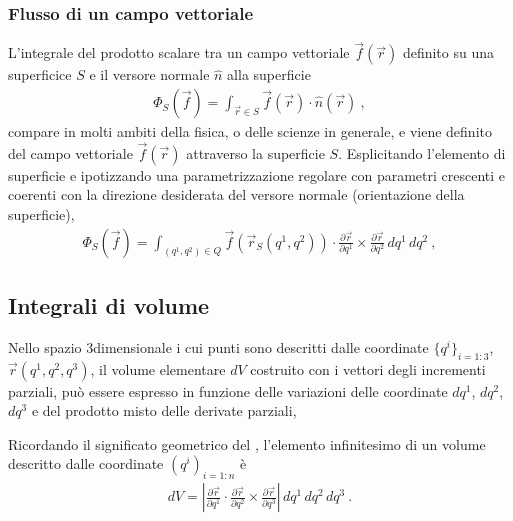 \documentclass[letterpaper,10pt,italian]{jupyterBook}
\begin{document}
\subsubsection{Flusso di un campo vettoriale}
\label{\detokenize{ch/vector-calculus/integrals:flusso-di-un-campo-vettoriale}}\label{\detokenize{ch/vector-calculus/integrals:vector-calculus-integrals-surface-flux}}
\sphinxAtStartPar
L’integrale del prodotto scalare tra un campo vettoriale \(\vec{f}(\vec{r})\) definito su una superficice \(S\) e il versore normale \(\hat{n}\) alla superficie
\begin{equation}\label{equation:ch/vector-calculus/integrals:eq:integral:flux}
\begin{split}\Phi_{S}(\vec{f}) = \int_{\vec{r} \in S} \vec{f}(\vec{r}) \cdot \hat{n}(\vec{r}) \ ,\end{split}
\end{equation}
\sphinxAtStartPar
compare in molti ambiti della fisica, o delle scienze in generale, e viene definito  del campo vettoriale \(\vec{f}(\vec{r})\) attraverso la superficie \(S\). Esplicitando l’elemento di superficie e ipotizzando una parametrizzazione regolare con parametri crescenti e coerenti con la direzione desiderata del versore normale (orientazione della superficie),
\begin{equation}\label{equation:ch/vector-calculus/integrals:eq:integral:flux:coords}
\begin{split}\Phi_{S}(\vec{f}) = \int_{(q^1, q^2) \in Q} \vec{f}(\vec{r}_S(q^1, q^2)) \cdot \frac{\partial \vec{r}}{\partial q^1} \times \frac{\partial \vec{r}}{\partial q^2} \, d q^1 \, d q^2 \ ,\end{split}
\end{equation}

\subsection{Integrali di volume}
\label{\detokenize{ch/vector-calculus/integrals:integrali-di-volume}}\label{\detokenize{ch/vector-calculus/integrals:vector-calculus-integrals-volume}}
\sphinxAtStartPar
Nello spazio 3\sphinxhyphen{}dimensionale i cui punti sono descritti dalle coordinate \(\{ q^i \}_{i=1:3}\), \(\vec{r}(q^1, q^2, q^3)\), il volume elementare \(dV\) costruito con i vettori degli incrementi parziali, può essere espresso in funzione delle variazioni delle coordinate \(d q^1\), \(d q^2\), \(d q^3\) e del prodotto misto delle derivate parziali,

\sphinxAtStartPar
Ricordando il significato geometrico del , l’elemento infinitesimo di un volume descritto dalle coordinate \(\left( q^i \right)_{i=1:n}\) è
\begin{equation*}
\begin{split}dV = \left| \frac{\partial \vec{r}}{\partial q^1} \cdot \frac{\partial \vec{r}}{\partial q^2} \times \frac{\partial \vec{r}}{\partial q^3} \right| \, d q^1 \, d q^2 \, d q^3 \ .\end{split}
\end{equation*}
\sphinxstepscope
\end{document}
